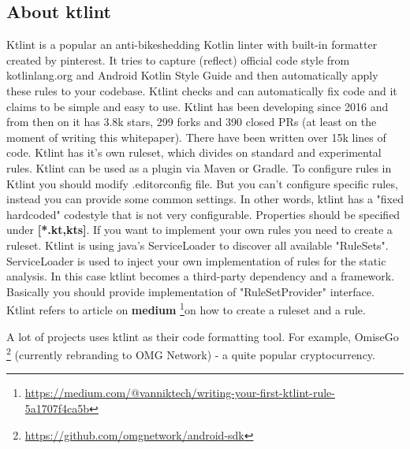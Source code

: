 \subsection{About ktlint}
\par Ktlint is a popular an anti-bikeshedding Kotlin linter with built-in formatter created by pinterest. It tries to capture (reflect) official code style from kotlinlang.org and Android Kotlin Style Guide and then automatically apply these rules to your codebase. Ktlint checks and can automatically fix code and it claims to be simple and easy to use. Ktlint has been developing since 2016 and from then on it has 3.8k stars, 299 forks and 390 closed PRs (at least on the moment of writing this whitepaper). There have been written over 15k lines of code. Ktlint has it's own ruleset, which divides on standard and experimental rules. Ktlint can be used as a plugin via Maven or Gradle. To configure rules in Ktlint you should modify .editorconfig file. But you can't configure specific rules, instead you can provide some common settings. In other words, ktlint has a "fixed hardcoded" codestyle that is not very configurable. Properties should be specified under \textbf{[*.{kt,kts}]}. If you want to implement your own rules you need to create a ruleset. Ktlint is using java's ServiceLoader to discover all available "RuleSets". ServiceLoader is used to inject your own implementation of rules for the static analysis. In this case ktlint becomes a third-party dependency and a framework. Basically you should provide implementation of "RuleSetProvider" interface. Ktlint refers to article on \textbf{medium} \footnote{\url{https://medium.com/@vanniktech/writing-your-first-ktlint-rule-5a1707f4ca5b}}on how to create a ruleset and a rule.
\par A lot of projects uses ktlint as their code formatting tool. For example, OmiseGo \footnote{\url{https://github.com/omgnetwork/android-sdk}} (currently rebranding to OMG Network) - a quite popular cryptocurrency.


